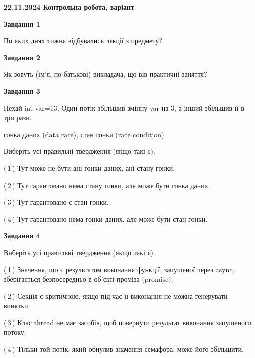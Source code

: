 \documentclass[12pt, ukrainian]{article}
\begin{document}
\begin {large}

\textbf{22.11.2024 Контрольна робота, варіант  }\par


{

\begin{center}
\textbf{Завдання 1}
\end{center}

По яких днях тижня відбувались лекції з предмету?


\begin{center}
\textbf{Завдання 2}
\end{center}

Як зовуть (ім'я, по батькові) викладача, що вів практичні заняття?


\begin{center}
\textbf{Завдання 3}
\end{center}

Нехай int var=13; Один потік збільшив змінну var на 3, а інший збільшив її в три рази.

гонка даних (data race), стан гонки (race condition)

Виберіть усі правильні твердження (якщо такі є).\par
\vspace{2mm}
(\,1\,) Тут може не бути ані гонки даних, ані стану гонки.%

(\,2\,) Тут гарантовано нема стану гонки, але може бути гонка даних.%

(\,3\,) Тут гарантовано є стан гонки.%

(\,4\,) Тут гарантовано нема гонки даних, але може бути стан гонки.%


\begin{center}
\textbf{Завдання 4}
\end{center}

Виберіть усі правильні твердження (якщо такі є).\par
\vspace{2mm}

(\,1\,) Значення, що є результатом виконання функції, запущеної через async, зберігається безпосередньо в об’єкті проміза (promise).%

(\,2\,) Секція є критичною, якщо під час її виконання не можна генерувати винятки.%

(\,3\,) Клас thread не має засобів, щоб повернути результат виконання запущеного потоку.%

(\,4\,) Тільки той потік, який обнулив значення семафора, може його збільшити.%


}
\end{large}
\end{document}

